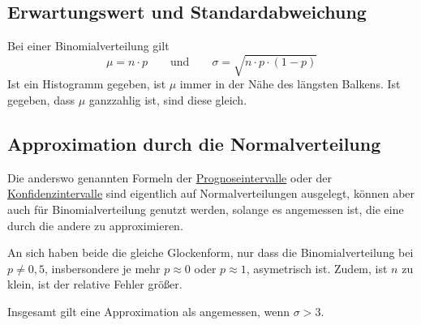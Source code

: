 \documentclass{article}
\begin{document}
\subsection{Erwartungswert und Standardabweichung}
Bei einer Binomialverteilung gilt
\[
 \mu = n \cdot p 
 \qquad \text{und} \qquad
 \sigma = \sqrt{n \cdot p \cdot (1-p)} 
\]
Ist ein Histogramm gegeben, ist $\mu$ immer in der Nähe des längsten Balkens. Ist gegeben, dass $\mu$ ganzzahlig ist, sind diese gleich.
 
\subsection{Approximation durch die Normalverteilung}
Die anderswo genannten Formeln der \hyperref[Prognoseintervalle]{Prognoseintervalle} oder der \hyperref[Konfidenzintervalle]{Konfidenzintervalle} sind eigentlich auf Normalverteilungen ausgelegt, können aber auch für Binomialverteilung genutzt werden, solange es angemessen ist, die eine durch die andere zu approximieren.
 
An sich haben beide die gleiche Glockenform, nur dass die Binomialverteilung bei $p \ne 0,5$, insbersondere je mehr $p \approx 0$ oder $p \approx 1$, asymetrisch ist. Zudem, ist $n$ zu klein, ist der relative Fehler größer.
 
Insgesamt gilt eine Approximation als angemessen, wenn $\sigma > 3$. 
\end{document}
